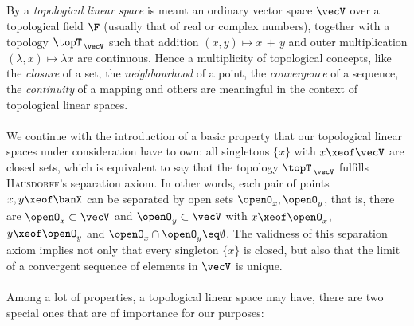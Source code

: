 \documentclass[11pt,twoside]{article}
\begin{document}
\subparagraph{} %
By a \textit{topological linear space} is meant an ordinary vector space $\vecV$
over a topological field $\F$ (usually that of real or complex numbers),
together with a topology $\topT_{\,\vecV}$ 
such that addition $(x,y) \mapsto x\,{+}\,y$
and outer multiplication $(\lambda,x) \mapsto \lambda x$ are continuous.
Hence a multiplicity of topological concepts,
like
the \textit{closure} of a set,
the \textit{neighbourhood} of a point,
the \textit{convergence} of a sequence,
the \textit{continuity} of a mapping and others
are meaningful in the context of topological linear spaces.

\paragraph{} %
We continue with the introduction of a basic property
that our topological linear spaces under consideration have to own:
all singletons $\{x\}$ with $x \xeof \vecV$ are closed sets,
which is equivalent to say
that the topology $\topT_{\,\vecV}$
fulfills \textsc{Hausdorff}'s separation axiom.
In other words,
each pair of points $x,y \xeof \banX$ can be separated
by open sets $\openO_x, \openO_y$,
that is,
there are $\openO_x \subset \vecV$ and $\openO_y \subset \vecV$ with
$x \xeof \openO_x$,
$y \xeof \openO_y$ and
$\openO_x \cap \openO_y \eq \emptyset$.
The validness of this separation axiom implies not only
that every singleton $\{x\}$ is closed,
but also
that the limit of a convergent sequence of elements in $\vecV$ is unique.

\paragraph{} %
Among a lot of properties,
a topological linear space may have,
there are two special ones
that are of importance for our purposes:
\end{document}
